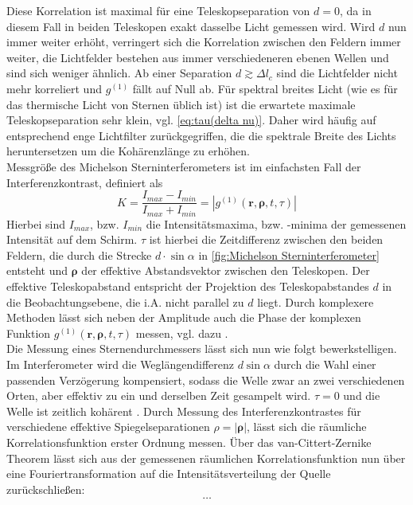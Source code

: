 Diese Korrelation ist maximal für eine Teleskopseparation von $d=0$, da in diesem Fall in beiden Teleskopen exakt dasselbe Licht gemessen wird. 
Wird $d$ nun immer weiter erhöht, verringert sich die Korrelation zwischen den Feldern immer weiter, die Lichtfelder bestehen aus immer verschiedeneren ebenen Wellen und sind sich weniger ähnlich. 
Ab einer Separation $d\gtrsim\Delta l_c$ sind die Lichtfelder nicht mehr korreliert und $g^{(1)}$ fällt auf Null ab. 
Für spektral breites Licht (wie es für das thermische Licht von Sternen üblich ist) ist die erwartete maximale Teleskopseparation sehr klein, vgl. \autoref{eq:tau(delta nu)}. 
Daher wird häufig auf entsprechend enge Lichtfilter zurückgegriffen, die die spektrale Breite des Lichts heruntersetzen um die Kohärenzlänge zu erhöhen. \\


Messgröße des Michelson Sterninterferometers ist im einfachsten Fall der Interferenzkontrast, definiert als \cite{foellmiIntensityInterferometrySecondorder2009}
\begin{equation}
    K = \frac{I_{max}-I_{min}}{I_{max}+I_{min}}=\left|g^{(1)}(\mathbf{r}, \bm{\rho}, t, \tau)\right|
\end{equation} 
Hierbei sind $I_{max}$, bzw. $I_{min}$ die Intensitätsmaxima, bzw. -minima der gemessenen Intensität auf dem Schirm. 
$\tau$ ist hierbei die Zeitdifferenz zwischen den beiden Feldern, die durch die Strecke $d\cdot\sin \alpha$ in \autoref{fig:Michelson Sterninterferometer} entsteht und $\bm{\rho}$ der effektive Abstandsvektor zwischen den Teleskopen. 
Der effektive Teleskopabstand entspricht der Projektion des Teleskopabstandes $d$ in die Beobachtungsebene, die i.A. nicht parallel zu $d$ liegt. 
Durch komplexere Methoden lässt sich neben der Amplitude auch die Phase der komplexen Funktion $g^{(1)}(\mathbf{r}, \bm{\rho}, t, \tau)$ messen, vgl. dazu \cite[Kap. 4.3]{mandelOpticalCoherenceQuantum1995}. \\
Die Messung eines Sternendurchmessers lässt sich nun wie folgt bewerkstelligen. 
Im Interferometer wird die Weglängendifferenz $d \sin \alpha$ durch die Wahl einer passenden Verzögerung kompensiert, sodass die Welle zwar an zwei verschiedenen Orten, aber effektiv zu ein und derselben Zeit gesampelt wird. 
$\tau=0$ und die Welle ist zeitlich kohärent \cite{foellmiIntensityInterferometrySecondorder2009}. 
Durch Messung des Interferenzkontrastes für verschiedene effektive Spiegelseparationen $\rho=|\bm{\rho}|$, lässt sich die räumliche Korrelationsfunktion erster Ordnung messen. 
Über das van-Cittert-Zernike Theorem lässt sich aus der gemessenen räumlichen Korrelationsfunktion nun über eine Fouriertransformation auf die Intensitätsverteilung der Quelle zurückschließen:
\begin{equation}
    \dots
\end{equation}

